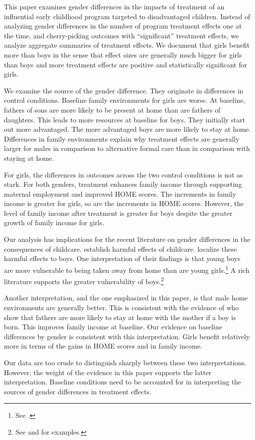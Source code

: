 This paper examines gender differences in the impacts of treatment of an influential early childhood program targeted to disadvantaged children. Instead of  analyzing gender differences in the number of program treatment effects one at the time, and cherry-picking outcomes with ``significant'' treatment effects, we analyze aggregate summaries of treatment effects. We document that girls benefit more than boys in the sense that effect sizes are generally much bigger for girls than boys and more treatment effects are positive and statistically significant for girls.

We examine the source of the gender difference. They originate in differences in control conditions. Baseline family environments for girls are worse. At baseline, fathers of sons are more likely to be present at home than are fathers of daughters. This leads to more resources at baseline for boys. They initially start out more advantaged. The more advantaged boys are more likely to stay at home. Differences in family environments explain why treatment effects are generally larger for males in comparison to alternative formal care than in comparison with staying at home. 

For girls, the differences in outcomes across the two control conditions is not as stark. For both genders, treatment enhances family income through supporting maternal employment and improved HOME scores. The increments in family income is greater for girls, so are the increments in HOME scores. However, the level of family income after treatment is greater for boys despite the greater growth of family income for girls.

Our analysis has implications for the recent literature on gender differences in the consequences of childcare. \citet{Baker_etal_2008_Universal_Childcare_JPE,Baker_Gruber_Milligan_2015_Noncog_Defects} establish harmful effects of childcare. \citet{Kottelenberg_Lehrer_2014_Gender-Effects} localize these harmful effects to boys. One interpretation of their findings is that young boys are more vulnerable to being taken away from home than are young girls.\footnote{See \citet{Garcia_etal_2019_ECE_IMHJ}.} A rich literature supports the greater vulnerability of boys.\footnote{See \citet{Golding_Fitzgerald_2017_IMHJ} and \citet{Schore_2017_IMHJ} for examples.}

Another interpretation, and the one emphasized in this paper, is that male home environments are generally better. This is consistent with the evidence of \citet{Dahl_Moretti_2008_RES} who show that fathers are more likely to stay at home with the mother if a boy is born. This improves family income at baseline. Our evidence on baseline differences by gender is consistent with this interpretation. Girls benefit relatively more in terms of the gains in HOME scores and in family income.

Our data are too crude to distinguish sharply between these two interpretations. However, the weight of the evidence in this paper supports the latter interpretation. Baseline conditions need to be accounted for in interpreting the sources of gender differences in treatment effects. 